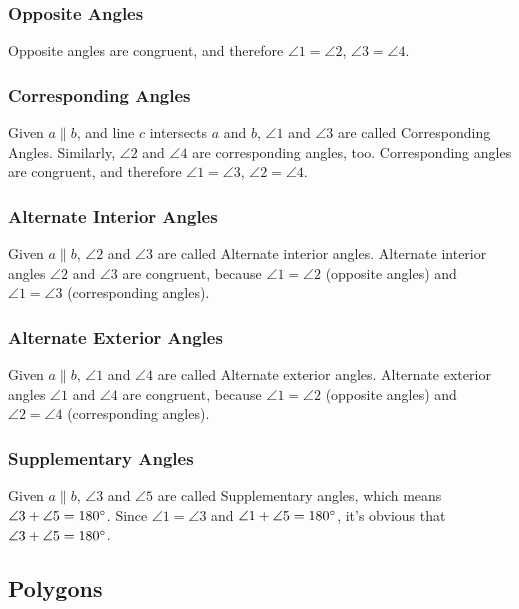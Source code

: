 \documentclass[11pt, oneside]{article}   	%
\begin{document}
\subsubsection{Opposite Angles}
Opposite angles are congruent, and therefore $\angle 1 = \angle 2$, $\angle 3 = \angle 4$. 

\subsubsection{Corresponding Angles}
Given $a \parallel b$, and line $c$ intersects $a$ and $b$, $\angle 1$ and $\angle 3$ are called Corresponding Angles. Similarly, $\angle 2$ and $\angle 4$ are corresponding angles, too. Corresponding angles are congruent, and therefore  $\angle 1 = \angle 3$, $\angle 2 = \angle 4$. 

\subsubsection{Alternate Interior Angles}
Given $a \parallel b$, $\angle 2$ and $\angle 3$ are called Alternate interior angles. Alternate interior angles $\angle 2$ and $\angle 3$ are congruent, because $\angle 1 = \angle 2$ (opposite angles) and $\angle 1 = \angle 3$ (corresponding angles). 

\subsubsection{Alternate Exterior Angles}
Given $a \parallel b$, $\angle 1$ and $\angle 4$ are called Alternate exterior angles. Alternate exterior angles $\angle 1$ and $\angle 4$ are congruent, because $\angle 1 = \angle 2$ (opposite angles) and $\angle 2 = \angle 4$ (corresponding angles). 

\subsubsection{Supplementary Angles}
Given  $a \parallel b$, $\angle 3$ and $\angle 5$ are called Supplementary angles, which means $\angle 3 + \angle 5 = 180\degree$. Since $\angle 1 = \angle 3$ and $\angle 1 + \angle 5 = 180\degree$, it's obvious that $\angle 3 + \angle 5 = 180\degree$. 


\subsection{Polygons} 
\end{document}
